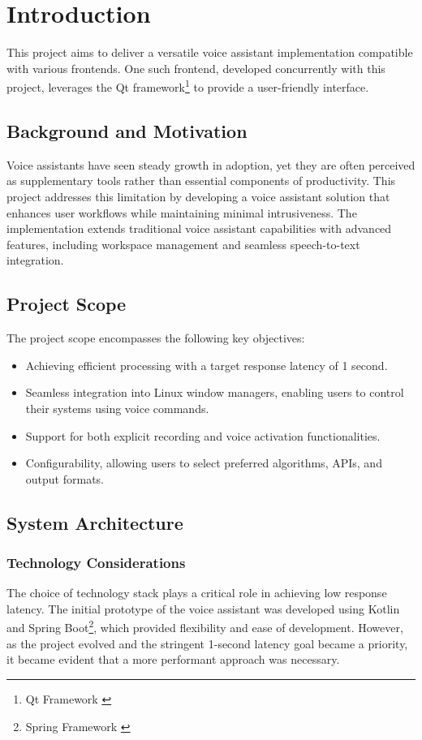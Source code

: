 \renewcommand*\chapterpagestyle{scrheadings}
\chapter{Introduction}

This project aims to deliver a versatile voice assistant implementation
compatible with various frontends. One such frontend,
developed concurrently with this project,
leverages the Qt framework\footnote{Qt Framework \cite{qt}}
to provide a user-friendly interface.

\section{Background and Motivation}
Voice assistants have seen steady growth in adoption,
yet they are often perceived as supplementary tools
rather than essential components of productivity.
This project addresses this limitation by developing a voice assistant solution
that enhances user workflows while maintaining minimal intrusiveness.
The implementation extends traditional voice assistant capabilities
with advanced features, including workspace management and seamless speech-to-text integration.

\section{Project Scope}
The project scope encompasses the following key objectives:
\begin{itemize}
    \item Achieving efficient processing with a target response latency of 1 second.
    \item Seamless integration into Linux window managers, enabling users to control their systems using voice commands.
    \item Support for both explicit recording and voice activation functionalities.
    \item Configurability, allowing users to select preferred algorithms, APIs, and output formats.
\end{itemize}

\section{System Architecture}
\subsection{Technology Considerations}
The choice of technology stack plays a critical role in achieving low response latency.
The initial prototype of the voice assistant was developed using Kotlin and Spring Boot\footnote{Spring Framework \cite{spring}},
which provided flexibility and ease of development.
However, as the project evolved and the stringent 1-second latency goal became a priority,
it became evident that a more performant approach was necessary.

